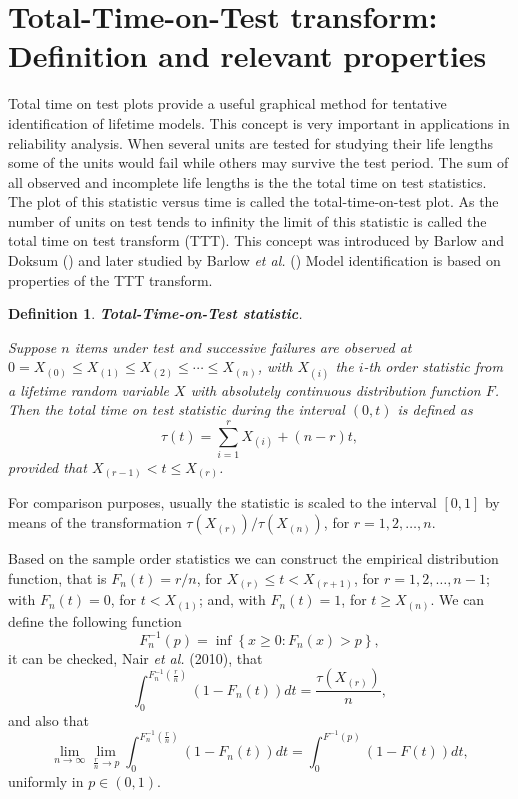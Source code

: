 \documentclass[preprint,12pt]{elsarticle}
\newtheorem{dfn}{{\sc Definition}}[section]
\begin{document}
\section{Total-Time-on-Test transform: Definition and relevant properties}

Total time on test plots provide a useful graphical method for tentative identification of lifetime models. This concept is very important in applications in reliability analysis. When several units are tested for studying their life lengths some of the units would fail while others may survive the test period. The sum of all observed and incomplete life lengths is the the total time on test statistics. The plot of this statistic versus time is called the total-time-on-test plot. As the number of units on test tends to infinity the limit of this statistic is called the total time on test transform (TTT). This concept was introduced by Barlow and Doksum () and later studied by Barlow {\it et al.} ()
Model identification is based on properties of the TTT transform. 

\begin{dfn}\label{def.ttt} \textbf{Total-Time-on-Test statistic}.

\noindent Suppose $n$ items under test and successive failures are observed at $0=X_{(0)} \leq X_{(1)} \leq X_{(2)}\leq \cdots \leq X_{(n)}$, with $X_{(i)}$ the $i$-th order statistic from a lifetime random variable $X$ with absolutely continuous distribution function $F$. Then the \textit{total time on test statistic} during the interval $(0,t)$ is defined as 
\[
\tau (t) = \sum_{i=1}^r X_{(i)}+\left(n-r\right)t,
\]
provided that $X_{(r-1)}<t\leq X_{(r)}$.

\end{dfn}

For comparison purposes, usually the statistic is scaled to the interval $[0,1]$ by means of the transformation $\tau\left(X_{(r)}\right)/\tau\left(X_{(n)}\right)$, for $r=1,2,\ldots,n$.

Based on the sample order statistics we can construct the empirical distribution function, that is $F_n(t)=r/n$, for $X_{(r)} \leq t < X_{(r+1)}$, for $r=1,2,\ldots,n-1$; with $F_n(t)=0$, for $t <X_{(1)}$; and, with $F_n(t)=1$, for $t \geq X_{(n)}$. We can define the following function
\[
F^{-1}_n(p)= \inf \left\{x \geq 0:F_n(x) >p\right\},
\]
it can be checked, Nair {\it et al.} (2010), that
\[
\int_0^{F^{-1}_n\left(\frac{r}{n}\right)} \left(1-F_n(t)\right)dt= \frac{\tau\left(X_{(r)}\right)}{n},
\]
and also that
\[
\underset{n\rightarrow \infty}{\lim}\underset{\frac{r}{n}\rightarrow p}{\lim}\int_0^{F^{-1}_n\left(\frac{r}{n}\right)}\left(1-F_n(t)\right) dt= \int_0^{F^{-1}(p)}\left(1-F(t)\right) dt,
\]
uniformly in $p\in (0,1)$. 
\end{document}

